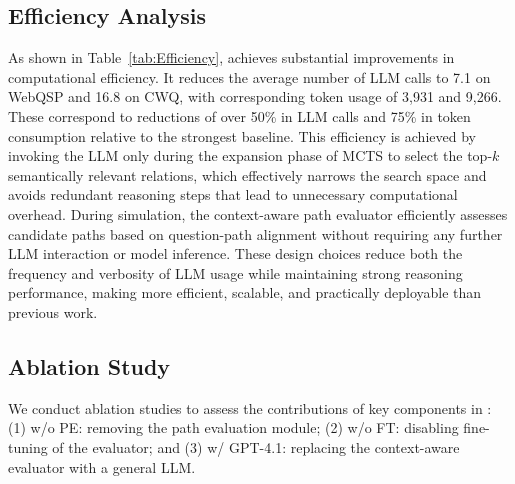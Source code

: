 \vspace{-1pt}
\subsection{Efficiency Analysis}
As shown in Table~\ref{tab:Efficiency}, \method{} achieves substantial improvements in computational efficiency. It reduces the average number of LLM calls to 7.1 on WebQSP and 16.8 on CWQ, with corresponding token usage of 3,931 and 9,266. These correspond to reductions of over 50\% in LLM calls and 75\% in token consumption relative to the strongest baseline. This efficiency is achieved by invoking the LLM only during the expansion phase of MCTS to select the top-$k$ semantically relevant relations, which effectively narrows the search space and avoids redundant reasoning steps that lead to unnecessary computational overhead. During simulation, the context-aware path evaluator efficiently assesses candidate paths based on question-path alignment without requiring any further LLM interaction or model inference. These design choices reduce both the frequency and verbosity of LLM usage while maintaining strong reasoning performance, making \method{} more efficient, scalable, and practically deployable than previous work.




\subsection{Ablation Study}\label{sec:ablation}

We conduct ablation studies to assess the contributions of key components in \method{}: (1) \method{} w/o PE: removing the path evaluation module; (2) \method{} w/o FT: disabling fine-tuning of the evaluator; and (3) \method{} w/ GPT-4.1: replacing the context-aware evaluator with a general LLM.


